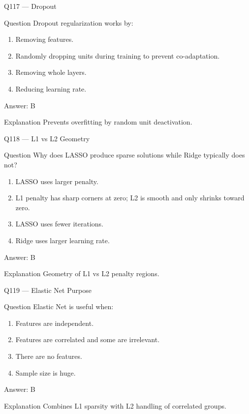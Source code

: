 \documentclass[aspectratio=169,8pt]{beamer}
\begin{document}
\begin{frame}{Q117 --- Dropout}
\begin{block}{Question}
Dropout regularization works by:
\end{block}
\begin{enumerate}
\item Removing features.
\item Randomly dropping units during training to prevent co-adaptation.
\item Removing whole layers.
\item Reducing learning rate.
\end{enumerate}

\begin{exampleblock}{Answer: B}\end{exampleblock}
\begin{block}{Explanation}
Prevents overfitting by random unit deactivation.
\end{block}
\end{frame}

\begin{frame}{Q118 --- L1 vs L2 Geometry}
\begin{block}{Question}
Why does LASSO produce sparse solutions while Ridge typically does not?
\end{block}
\begin{enumerate}
\item LASSO uses larger penalty.
\item L1 penalty has sharp corners at zero; L2 is smooth and only shrinks toward zero.
\item LASSO uses fewer iterations.
\item Ridge uses larger learning rate.
\end{enumerate}

\begin{exampleblock}{Answer: B}\end{exampleblock}
\begin{block}{Explanation}
Geometry of L1 vs L2 penalty regions.
\end{block}
\end{frame}

\begin{frame}{Q119 --- Elastic Net Purpose}
\begin{block}{Question}
Elastic Net is useful when:
\end{block}
\begin{enumerate}
\item Features are independent.
\item Features are correlated and some are irrelevant.
\item There are no features.
\item Sample size is huge.
\end{enumerate}

\begin{exampleblock}{Answer: B}\end{exampleblock}
\begin{block}{Explanation}
Combines L1 sparsity with L2 handling of correlated groups.
\end{block}
\end{frame}
\end{document}
